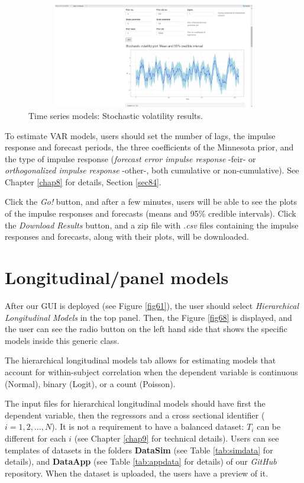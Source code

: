 \begin{figure}
	\includegraphics[width=340pt, height=130pt]{Chapters/chapterGUI/figures/Figure8c.jpg}
	\caption[List of figure caption goes here]{Time series models: Stochastic volatility results.}\label{fig8c}
\end{figure} 

To estimate VAR models, users should set the number of lags, the impulse response and forecast periods, the three coefficients of the Minnesota prior, and the type of impulse response (\textit{forecast error impulse response} -feir- or \textit{orthogonalized impulse response} -other-, both cumulative or non-cumulative). See Chapter \ref{chap8} for details, Section \ref{sec84}.

Click the \textit{Go!} button, and after a few minutes, users will be able to see the plots of the impulse responses and forecasts (means and 95\% credible intervals). Click the \textit{Download Results} button, and a zip file with \textit{.csv} files containing the impulse responses and forecasts, along with their plots, will be downloaded.

\section{Longitudinal/panel models}\label{secGUI5}
After our GUI is deployed (see Figure \ref{fig61}), the user should select \textit{Hierarchical Longitudinal Models} in the top panel. Then, the Figure \ref{fig68} is displayed, and the user can see the radio button on the left hand side that shows the specific models inside this generic class.

The hierarchical longitudinal models tab allows for estimating models that account for within-subject correlation when the dependent variable is continuous (Normal), binary (Logit), or a count (Poisson).

The input files for hierarchical longitudinal models should have first the dependent variable, then the regressors and a cross sectional identifier ($i=1,2,\dots,N$). It is not a requirement to have a balanced dataset: $T_i$ can be different for each $i$ (see Chapter \ref{chap9} for technical details). Users can see templates of datasets in the folders \textbf{DataSim} (see Table \ref{tab:simdata} for details), and \textbf{DataApp} (see Table \ref{tab:appdata} for details) of our \textit{GitHub} repository. When the dataset is uploaded, the users have a preview of it.

